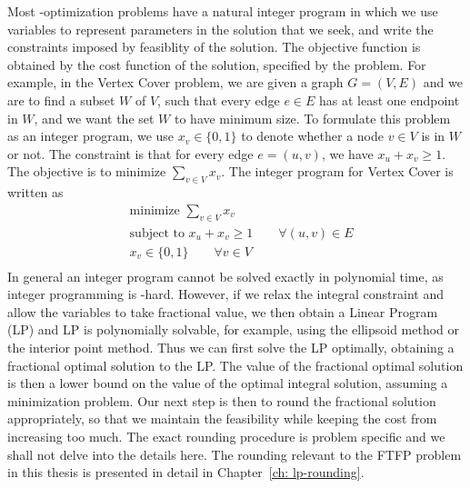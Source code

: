 \documentclass[oneside,final]{ucr}
\begin{document}
Most {\NP}-optimization problems have a natural integer
program in which we use variables to represent parameters in
the solution that we seek, and write the constraints imposed
by feasiblity of the solution. The objective function is
obtained by the cost function of the solution, specified by
the problem. For example, in the Vertex Cover problem, we
are given a graph $G=(V,E)$ and we are to find a subset $W$
of $V$, such that every edge $e\in E$ has at least one
endpoint in $W$, and we want the set $W$ to have minimum
size. To formulate this problem as an integer program, we
use $x_v \in \{0,1\}$ to denote whether a node $v\in V$ is
in $W$ or not. The constraint is that for every edge
$e=(u,v)$, we have $x_u + x_v \geq 1$. The objective is to
minimize $\sum_{v\in V} x_v$. The integer program for Vertex
Cover is written as
\begin{align*}
  &\text{minimize } \sum_{v\in V} x_v\\
  &\text{subject to } x_u + x_v \geq 1  \qquad \forall (u,v) \in
  E\\
  &x_v \in \{0, 1\} \qquad \forall v \in V\\
\end{align*}
In general an integer program cannot be solved exactly in
polynomial time, as integer programming is
{\NP}-hard. However, if we relax the integral constraint and
allow the variables to take fractional value, we then obtain
a Linear Program (LP) and LP is polynomially solvable, for
example, using the ellipsoid method or the interior point
method. Thus we can first solve the LP optimally, obtaining
a fractional optimal solution to the LP. The value of the
fractional optimal solution is then a lower bound on the
value of the optimal integral solution, assuming a
minimization problem. Our next step is then to round the
fractional solution appropriately, so that we maintain the
feasibility while keeping the cost from increasing too
much. The exact rounding procedure is problem specific and
we shall not delve into the details here. The rounding
relevant to the FTFP problem in this thesis is presented in
detail in Chapter~\ref{ch: lp-rounding}.
\end{document}
